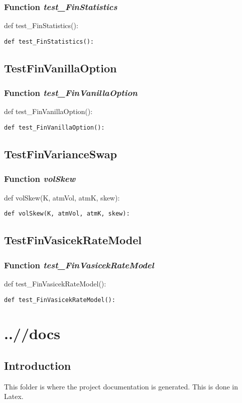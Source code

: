 \documentclass[twoside,11pt]{book}
\begin{document}
\subsection{Function {\it test\_FinStatistics}}
def test\_FinStatistics():

\begin{lstlisting}
def test_FinStatistics():
\end{lstlisting}


\newpage
\section{TestFinVanillaOption}

\subsection{Function {\it test\_FinVanillaOption}}
def test\_FinVanillaOption():

\begin{lstlisting}
def test_FinVanillaOption():
\end{lstlisting}


\newpage
\section{TestFinVarianceSwap}

\subsection{Function {\it volSkew}}
def volSkew(K, atmVol, atmK, skew):

\begin{lstlisting}
def volSkew(K, atmVol, atmK, skew):
\end{lstlisting}


\newpage
\section{TestFinVasicekRateModel}

\subsection{Function {\it test\_FinVasicekRateModel}}
def test\_FinVasicekRateModel():

\begin{lstlisting}
def test_FinVasicekRateModel():
\end{lstlisting}


\chapter{..//docs}
\section{Introduction}
This folder is where the project documentation is generated. This is done in Latex.
\end{document}
